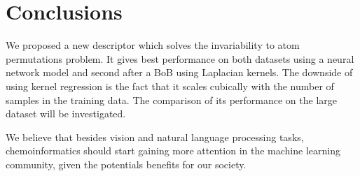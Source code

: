 \documentclass{article}
\begin{document}
\section{Conclusions}
We proposed a new descriptor which solves the invariability to atom permutations problem. It gives best performance on both datasets using a neural network model and second after a BoB using Laplacian kernels. The downside of using kernel regression is the fact that it scales cubically with the number of samples in the training data. 
The comparison of its performance on the large dataset will be investigated.

We believe that besides vision and natural language processing tasks, chemoinformatics  should start gaining more attention  in the machine learning community, given the potentials benefits for our society.





\end{document}
